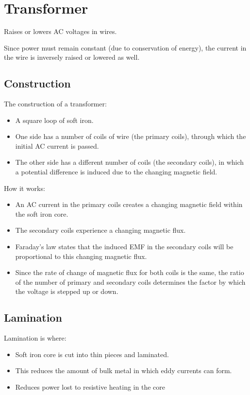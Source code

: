\documentclass[a4paper,11pt]{article}
\begin{document}
\section{Transformer}

Raises or lowers AC voltages in wires.

Since power must remain constant (due to conservation of energy), the current
in the wire is inversely raised or lowered as well.


\subsection{Construction}

The construction of a transformer:

\begin{itemize}
\item A square loop of soft iron.
\item One side has a number of coils of wire (the primary coils), through which
	the initial AC current is passed.
\item The other side has a different number of coils (the secondary coils),
	in which a potential difference is induced due to the changing magnetic
	field.
\end{itemize}

How it works:

\begin{itemize}
\item An AC current in the primary coils creates a changing magnetic field
	within the soft iron core.
\item The secondary coils experience a changing magnetic flux.
\item Faraday's law states that the induced EMF in the secondary coils will be
	proportional to this changing magnetic flux.
\item Since the rate of change of magnetic flux for both coils is the same,
	the ratio of the number of primary and secondary coils determines the
	factor by which the voltage is stepped up or down.
\end{itemize}


\subsection{Lamination}

Lamination is where:

\begin{itemize}
\item Soft iron core is cut into thin pieces and laminated.
\item This reduces the amount of bulk metal in which eddy currents can form.
\item Reduces power lost to resistive heating in the core
\end{itemize}
\end{document}

